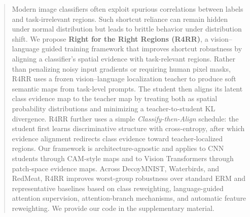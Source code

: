 \begin{abstract}
Modern image classifiers often exploit spurious correlations between labels and task-irrelevant regions. Such shortcut reliance can remain hidden under normal distribution but leads to brittle behavior under distribution shift. We propose \textbf{Right for the Right Regions (R4RR)}, a vision--language guided training framework that improves shortcut robustness by aligning a classifier's spatial evidence with task-relevant regions. Rather than penalizing noisy input gradients or requiring human pixel masks, R4RR uses a frozen vision--language localization teacher to produce soft semantic maps from task-level prompts. The student then aligns its latent class evidence map to the teacher map by treating both as spatial probability distributions and minimizing a teacher-to-student KL divergence. R4RR further uses a simple \emph{Classify-then-Align} schedule: the student first learns discriminative structure with cross-entropy, after which evidence alignment redirects class evidence toward teacher-localized regions. Our framework is architecture-agnostic and applies to CNN students through CAM-style maps and to Vision Transformers through patch-space evidence maps. Across DecoyMNIST, Waterbirds, and RedMeat, R4RR improves worst-group robustness over standard ERM and representative baselines based on class reweighting, language-guided attention supervision, attention-branch mechanisms, and automatic feature reweighting. We provide our code in the supplementary material.
\end{abstract}

